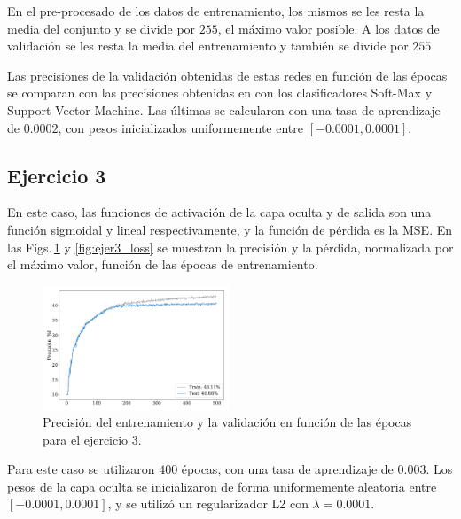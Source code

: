 En el pre-procesado de los datos de entrenamiento, los mismos se les resta la media del conjunto y se divide por $255$, el máximo valor posible. A los datos de validación se les resta la media del entrenamiento y también se divide por $255$


Las precisiones de la validación obtenidas de estas redes en función de las épocas se comparan con las precisiones obtenidas en con los clasificadores Soft-Max y Support Vector  Machine. Las últimas se calcularon con una tasa de aprendizaje de $0.0002$, con pesos inicializados uniformemente entre  $[-0.0001, 0.0001]$.

\subsection*{Ejercicio 3}
En este caso, las funciones de activación de la capa oculta y de salida son una función sigmoidal y lineal respectivamente,  y la función de pérdida es la MSE. En las Figs.\,\ref{fig:ejer3_acc} y \ref{fig:ejer3_loss} se muestran la precisión y la pérdida, normalizada por el máximo valor, función de las épocas de entrenamiento.

\begin{figure}[H]
    \begin{small}
        \begin{center}
            \includegraphics[width=0.495\textwidth]{Graphs/ejer3_acc.pdf}
        \end{center}
        \caption{Precisión del entrenamiento y la  validación en función de las épocas para el  ejercicio 3.}
        \label{fig:ejer3_acc}
    \end{small}
\end{figure}

Para este caso se utilizaron $400$ épocas, con una tasa de aprendizaje de $0.003$. Los pesos de la capa oculta se inicializaron de forma uniformemente aleatoria entre $[-0.0001, 0.0001]$, y se utilizó un regularizador L2 con $\lambda=0.0001$.

